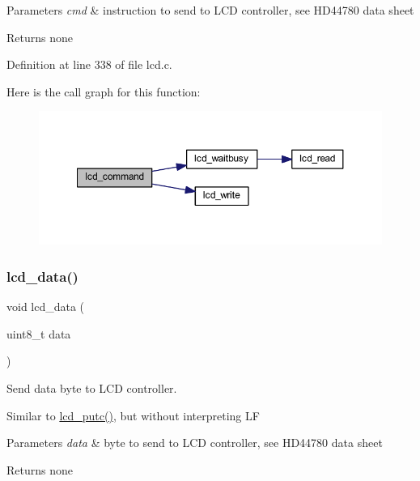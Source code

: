 \begin{DoxyParams}{Parameters}
{\em cmd} & instruction to send to L\+CD controller, see H\+D44780 data sheet \\
\hline
\end{DoxyParams}
\begin{DoxyReturn}{Returns}
none 
\end{DoxyReturn}


Definition at line 338 of file lcd.\+c.

Here is the call graph for this function\+:\nopagebreak
\begin{figure}[H]
\begin{center}
\leavevmode
\includegraphics[width=350pt]{group__pfleury__lcd_gaea9d14f02df06f948cb5a56776980826_cgraph}
\end{center}
\end{figure}
\mbox{\label{group__pfleury__lcd_gad0729d2cba627825a089ca1fff12ba29}} 
\subsubsection{\texorpdfstring{lcd\_data()}{lcd\_data()}}
{\footnotesize\ttfamily void lcd\+\_\+data (\begin{DoxyParamCaption}\item[{uint8\+\_\+t}]{data }\end{DoxyParamCaption})}



Send data byte to L\+CD controller. 

Similar to \mbox{\hyperlink{group__pfleury__lcd_gafa7e36b95c43d603f510273ad077cbbe}{lcd\+\_\+putc()}}, but without interpreting LF 
\begin{DoxyParams}{Parameters}
{\em data} & byte to send to L\+CD controller, see H\+D44780 data sheet \\
\hline
\end{DoxyParams}
\begin{DoxyReturn}{Returns}
none 
\end{DoxyReturn}


